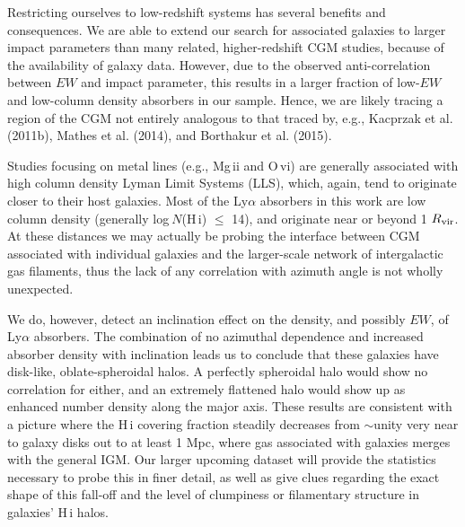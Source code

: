 Restricting ourselves to low-redshift systems has several benefits and consequences. We are able to extend our search for associated galaxies to larger impact parameters than many related, higher-redshift CGM studies, because of the availability of galaxy data. However, due to the observed anti-correlation between $EW$ and impact parameter, this results in a larger fraction of low-$EW$ and low-column density absorbers in our sample. Hence, we are likely tracing a region of the CGM not entirely analogous to that traced by, e.g., Kacprzak et al. (2011b), Mathes et al. (2014), and Borthakur et al. (2015).

Studies focusing on metal lines (e.g., Mg\,{\sc ii} and O\,{\sc vi}) are generally associated with high column density Lyman Limit Systems (LLS), which, again, tend to originate closer to their host galaxies. Most of the Ly$\alpha$ absorbers in this work are low column density (generally log$~N$(H\,{\sc i}) $\leq$ 14), and originate near or beyond 1 $R_{\rm vir}$. At these distances we may actually be probing the interface between CGM associated with individual galaxies and the larger-scale network of intergalactic gas filaments, thus the lack of any correlation with azimuth angle is not wholly unexpected.

We do, however, detect an inclination effect on the density, and possibly $EW$, of Ly$\alpha$ absorbers. The combination of no azimuthal dependence and increased absorber density with inclination leads us to conclude that these galaxies have disk-like, oblate-spheroidal halos. A perfectly spheroidal halo would show no correlation for either, and an extremely flattened halo would show up as enhanced number density along the major axis. These results are consistent with a picture where the H\,{\sc i} covering fraction steadily decreases from $\sim$unity very near to galaxy disks out to at least 1 Mpc, where gas associated with galaxies merges with the general IGM. Our larger upcoming dataset will provide the statistics necessary to probe this in finer detail, as well as give clues regarding the exact shape of this fall-off and the level of clumpiness or filamentary structure in galaxies' H\,{\sc i} halos.


